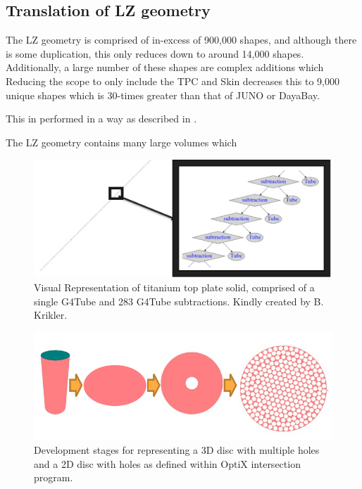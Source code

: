 \subsection{Translation of LZ geometry}
\par
The LZ geometry is comprised of in-excess of 900,000 shapes, and although there is some duplication, this only reduces down to around 14,000 shapes.
Additionally, a large number of these shapes are complex additions which 
Reducing the scope to only include the TPC and Skin decreases this to 9,000 unique shapes which is 30-times greater than that of JUNO or DayaBay.
\par
This in performed in a way as described in \cite{CSG_Intersection_ref}.

\par
The LZ geometry contains many large volumes which


\begin{figure}[!htbp]
\includegraphics[width=\textwidth]{Figures/Simulations/unbalanced_ptfe.png}
\centering
\caption{Visual Representation of titanium top plate solid, comprised of a single G4Tube and 283 G4Tube subtractions. Kindly created by B. Krikler.}
\label{fig:Opticks_unbalanced_shape}
\end{figure}



\begin{figure}[!htbp]
\includegraphics[width=\textwidth]{Figures/Simulations/opticks_PTFE_primative.png}
\centering
\caption{Development stages for representing a 3D disc with multiple holes and a 2D disc with holes as defined within OptiX intersection program.}
\label{fig:Opticks_PTFE_primative}
\end{figure}


